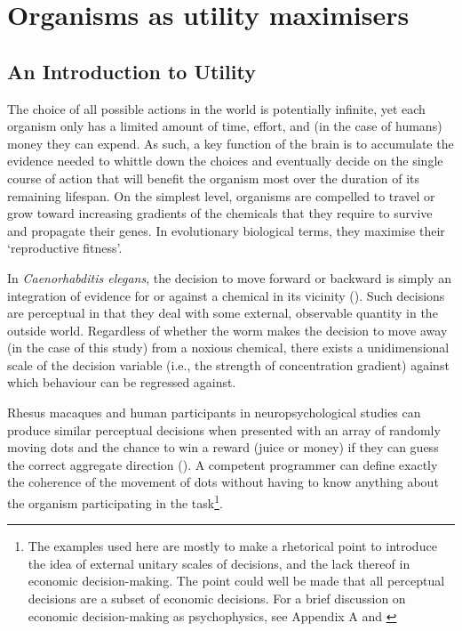 
\chapter{Organisms as utility maximisers}

\ifpdf
    \graphicspath{{Chapter1/Figs/Raster/}{Chapter1/Figs/PDF/}{Chapter1/Figs/}}
\else
    \graphicspath{{Chapter1/Figs/Vector/}{Chapter1/Figs/}}
\fi


\section{An Introduction to Utility}

The choice of all possible actions in the world is potentially infinite, yet each organism only has a limited amount of time, effort, and (in the case of humans) money they can expend. As such, a key function of the brain is to accumulate the evidence needed to whittle down the choices and eventually decide on the single course of action that will benefit the organism most over the duration of its remaining lifespan. On the simplest level, organisms are compelled to travel or grow toward increasing gradients of the chemicals that they require to survive and propagate their genes. In evolutionary biological terms, they maximise their ‘reproductive fitness’.

In \textit{Caenorhabditis elegans}, the decision to move forward or backward is simply an integration of evidence for or against a chemical in its vicinity (\cite{tanimotoCalciumDynamicsRegulating2017}). Such decisions are perceptual in that they deal with some external, observable quantity in the outside world. Regardless of whether the worm makes the decision to move away (in the case of this study) from a noxious chemical, there exists a unidimensional scale of the decision variable (i.e., the strength of concentration gradient) against which behaviour can be regressed against.

Rhesus macaques and human participants in neuropsychological studies can produce similar perceptual decisions when presented with an array of randomly moving dots and the chance to win a reward (juice or money) if they can guess the correct aggregate direction (\cite{shadlenNeuralBasisPerceptual2001}). A competent programmer can define exactly the coherence of the movement of dots without having to know anything about the organism participating in the task\footnote{The examples used here are mostly to make a rhetorical point to introduce the idea of external unitary scales of decisions, and the lack thereof in economic decision-making. The point could well be made that all perceptual decisions are a subset of economic decisions. For a brief discussion on economic decision-making as psychophysics, see Appendix A and \cite{lucePossiblePsychophysicalLaws1959}}.

